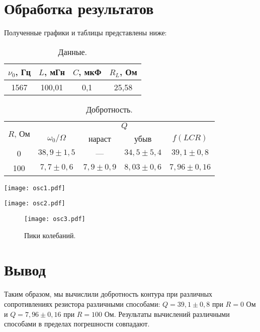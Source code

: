 \documentclass[a4paper,12pt]{article}
\begin{document}
	\section*{Обработка результатов}
		Полученные графики и таблицы представлены ниже:
		\begin{table}[H]
			\caption{Данные.}
			\label{table:D}
			\begin{tabular}{|c|c|c|c|}
				\hline
				$\nu_0$, Гц & $L$, мГн & $C$, мкФ & $R_L$, Ом \\ \hline
				1567 & 100,01 & 0,1 & 25,58 \\ \hline
			\end{tabular}
		\end{table}
		\begin{figure}
		\end{figure}
		\begin{table}[H]
			\caption{Добротность.}
			\label{table:Q}
			\begin{tabular}{|c||c|c|c|c|}
				\hline
				\multirow{2}{*}{$R$, Ом}  & \multicolumn{4}{c|}{$Q$} \\ \cline{2-5}
				& $\omega_0/\Omega$ & нараст & убыв & $f(LCR)$ \\
				\hline \hline
				0  & $38,9 \pm 1,5$  & --- & $34,5 \pm 5,4$ & $39,1 \pm 0,8$ \\
				100  & $7,7 \pm 0,6$ & $7,9 \pm 0,9$ & $8,03 \pm 0,6$ & $7,96 \pm 0,16$ \\ \hline
			\end{tabular}
		\end{table}
		\begin{minipage}{.48\textwidth}
			\centering
			\texttt{[image: osc1.pdf]}
		\end{minipage}
		\begin{minipage}{.48\textwidth}
			\centering
			\texttt{[image: osc2.pdf]}
		\end{minipage}
		\begin{figure}[H]
			\caption{Пики колебаний.}
			\texttt{[image: osc3.pdf]}
		\end{figure}
		
		
		\section*{Вывод}
			Таким образом, мы вычислили добротность контура при различных сопротивлениях резистора различными способами: $Q = 39,1 \pm 0,8$ при $R = 0$ Ом и $Q = 7,96 \pm 0,16$ при $R = 100$ Ом. Результаты вычислений различными способами в пределах погрешности совпадают.
			
\end{document}
